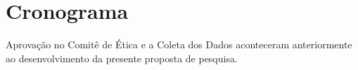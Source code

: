 \documentclass[chapter=TITLE,
               oneside,
               12pt,
               a4paper,
               english,
               brazil]{abntex2}    %
\begin{document}
\section{Cronograma}\label{sec:cronograma}

    \begin{table}[H]
        \caption{Cronograma do Projeto em Meses -- Junho de 2020 à Maio de 2021}
        \begin{threeparttable}
        \renewcommand{\TPTminimum}{\linewidth}
            \begin{tablenotes}
              \footnotesize
              \item Aprovação no Comitê de Ética e a Coleta dos Dados aconteceram
              anteriormente ao desenvolvimento da presente proposta de pesquisa.
            \end{tablenotes}
        \end{threeparttable}
    \end{table}%
\end{document}
